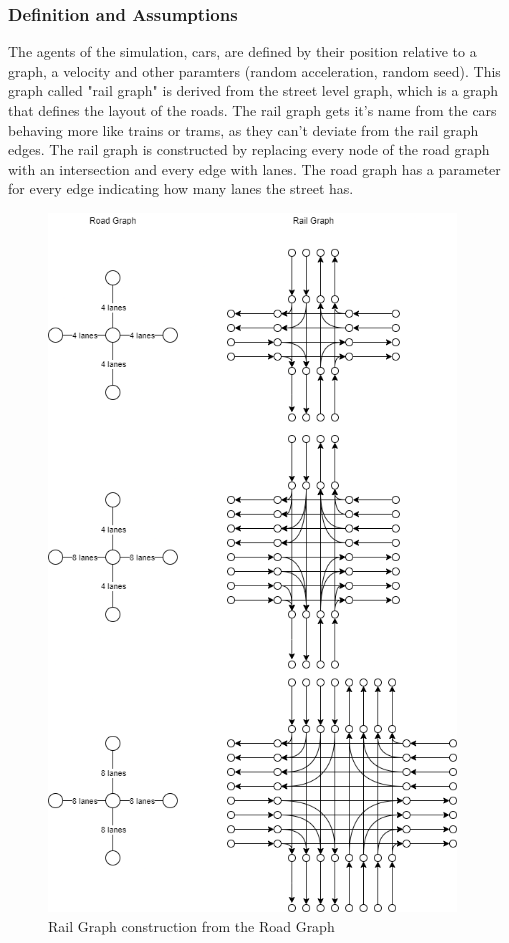 \documentclass[12pt]{article}
\begin{document}
\subsubsection{Definition and Assumptions}
The agents of the simulation, cars, are defined by their position relative to a graph, a velocity and other paramters (random acceleration, random seed). This graph called "rail graph" is derived from the street level graph, which is a graph that defines the layout of the roads. The rail graph gets it's name from the cars behaving more like trains or trams, as they can't deviate from the rail graph edges. The rail graph is constructed by replacing every node of the road graph with an intersection and every edge with lanes. The road graph has a parameter for every edge indicating how many lanes the street has.
\begin{figure}[H]
\begin{center}
\includegraphics[height=18.5cm]{railgraph}
\caption{Rail Graph construction from the Road Graph}
\end{center}
\end{figure}
\end{document}
